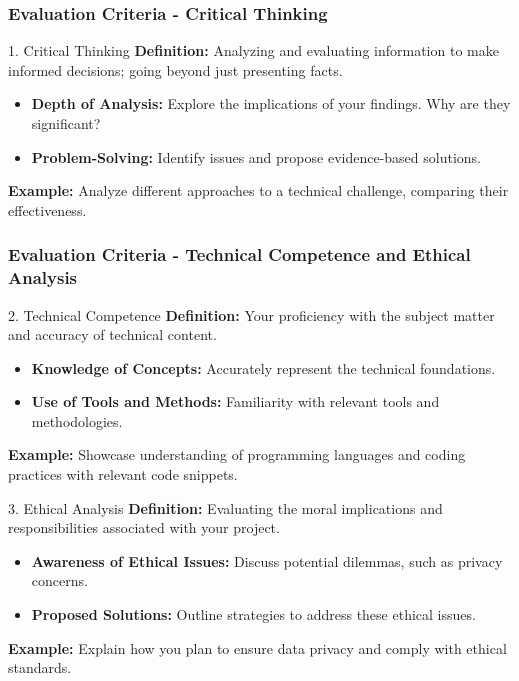 \documentclass[aspectratio=169]{beamer}
\begin{document}
\begin{frame}[fragile]
    \frametitle{Evaluation Criteria - Critical Thinking}
    \begin{block}{1. Critical Thinking}
        \textbf{Definition:} Analyzing and evaluating information to make informed decisions; going beyond just presenting facts.
        
        \begin{itemize}
            \item \textbf{Depth of Analysis:} Explore the implications of your findings. Why are they significant?
            \item \textbf{Problem-Solving:} Identify issues and propose evidence-based solutions.
        \end{itemize}
        
        \textbf{Example:} Analyze different approaches to a technical challenge, comparing their effectiveness.
    \end{block}
\end{frame}

\begin{frame}[fragile]
    \frametitle{Evaluation Criteria - Technical Competence and Ethical Analysis}
    \begin{block}{2. Technical Competence}
        \textbf{Definition:} Your proficiency with the subject matter and accuracy of technical content.
        
        \begin{itemize}
            \item \textbf{Knowledge of Concepts:} Accurately represent the technical foundations.
            \item \textbf{Use of Tools and Methods:} Familiarity with relevant tools and methodologies.
        \end{itemize}
        
        \textbf{Example:} Showcase understanding of programming languages and coding practices with relevant code snippets.
    \end{block}

    \vspace{1em} %
    
    \begin{block}{3. Ethical Analysis}
        \textbf{Definition:} Evaluating the moral implications and responsibilities associated with your project.
        
        \begin{itemize}
            \item \textbf{Awareness of Ethical Issues:} Discuss potential dilemmas, such as privacy concerns.
            \item \textbf{Proposed Solutions:} Outline strategies to address these ethical issues.
        \end{itemize}
        
        \textbf{Example:} Explain how you plan to ensure data privacy and comply with ethical standards.
    \end{block}
\end{frame}
\end{document}
